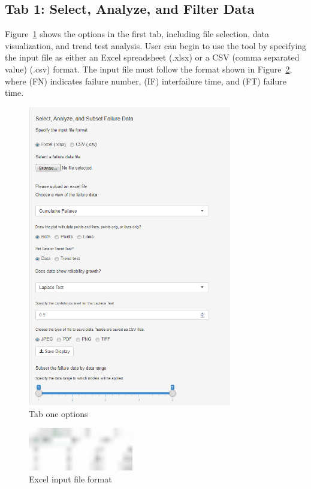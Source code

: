 \documentclass[journal]{IEEEtran}
\begin{document}
\subsection{Tab 1: Select, Analyze, and Filter Data}\label{tab1}
Figure~\ref{fig_Tab1_leftCol} shows the options in the first tab, including file selection, data visualization, and trend test analysis. User can begin to use the tool by specifying the input file as either an Excel spreadsheet (.xlsx) or a CSV (comma separated value) (.csv) format. The input file must follow the format shown in Figure~\ref{fig_Excel_sys1}, where (FN) indicates failure number, (IF) interfailure time, and (FT) failure time.

\begin{figure}[!h]
\centering
\includegraphics[width=3.5in]{Figures/Fig2}
\caption{Tab one options}
\label{fig_Tab1_leftCol}
\end{figure}

\begin{figure}[!h]
\centering
\includegraphics[width=1.8in]{Figures/sys1excel}
\caption{Excel input file format}
\label{fig_Excel_sys1}
\end{figure}
\end{document}
